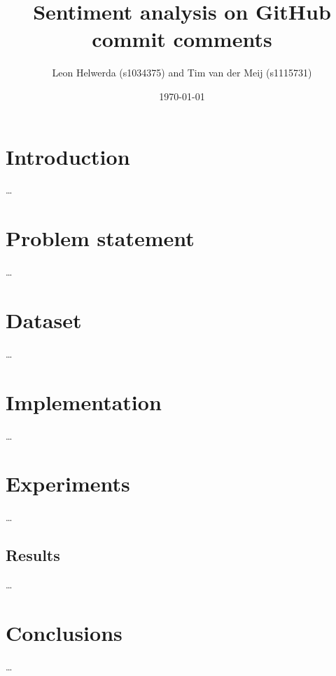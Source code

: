 \documentclass{article}
\begin{document}
\title{Sentiment analysis on GitHub commit comments}
\author{Leon Helwerda (s1034375) and Tim van der Meij (s1115731)}
\date{\today}
\maketitle

\section{Introduction}\label{sec:introduction}
\ldots

\section{Problem statement}\label{sec:problem}
\ldots

\section{Dataset}\label{sec:dataset}
\ldots

\section{Implementation}\label{sec:implementation}
\ldots

\section{Experiments}\label{sec:experiments}
\ldots

\subsection{Results}\label{sec:results}
\ldots

\section{Conclusions}\label{sec:conclusions}
\ldots
\end{document}

